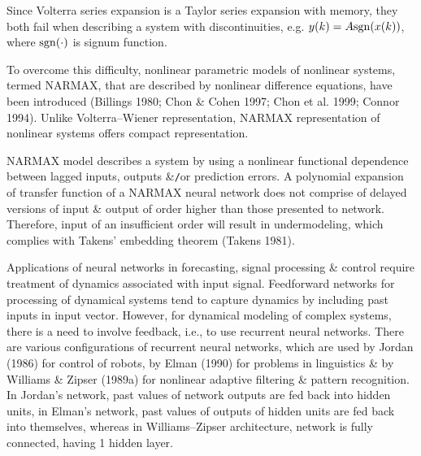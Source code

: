 \documentclass{article}
\begin{document}
\begin{enumerate}
\begin{itemize}
\begin{itemize}
			Since Volterra series expansion is a Taylor series expansion with memory, they both fail when describing a system with discontinuities, e.g. $y(k) = A{\rm sgn}(x(k))$, where ${\rm sgn}(\cdot)$ is signum function.
			
			To overcome this difficulty, nonlinear parametric models of nonlinear systems, termed NARMAX, that are described by nonlinear difference equations, have been introduced (Billings 1980; Chon \& Cohen 1997; Chon et al. 1999; Connor 1994). Unlike Volterra--Wiener representation, NARMAX representation of nonlinear systems offers compact representation.
			
			NARMAX model describes a system by using a nonlinear functional dependence between lagged inputs, outputs \&{\tt/}or prediction errors. A polynomial expansion of transfer function of a NARMAX neural network does not comprise of delayed versions of input \& output of order higher than those presented to network. Therefore, input of an insufficient order will result in undermodeling, which complies with Takens' embedding theorem (Takens 1981).
			
			Applications of neural networks in forecasting, signal processing \& control require treatment of dynamics associated with input signal. Feedforward networks for processing of dynamical systems tend to capture dynamics by including past inputs in input vector. However, for dynamical modeling of complex systems, there is a need to involve feedback, i.e., to use recurrent neural networks. There are various configurations of recurrent neural networks, which are used by Jordan (1986) for control of robots, by Elman (1990) for problems in linguistics \& by Williams \& Zipser (1989a) for nonlinear adaptive filtering \& pattern recognition. In Jordan's network, past values of network outputs are fed back into hidden units, in Elman's network, past values of outputs of hidden units are fed back into themselves, whereas in Williams--Zipser architecture, network is fully connected, having 1 hidden layer.
			

\end{itemize}
\end{itemize}
\end{enumerate}
\end{document}
